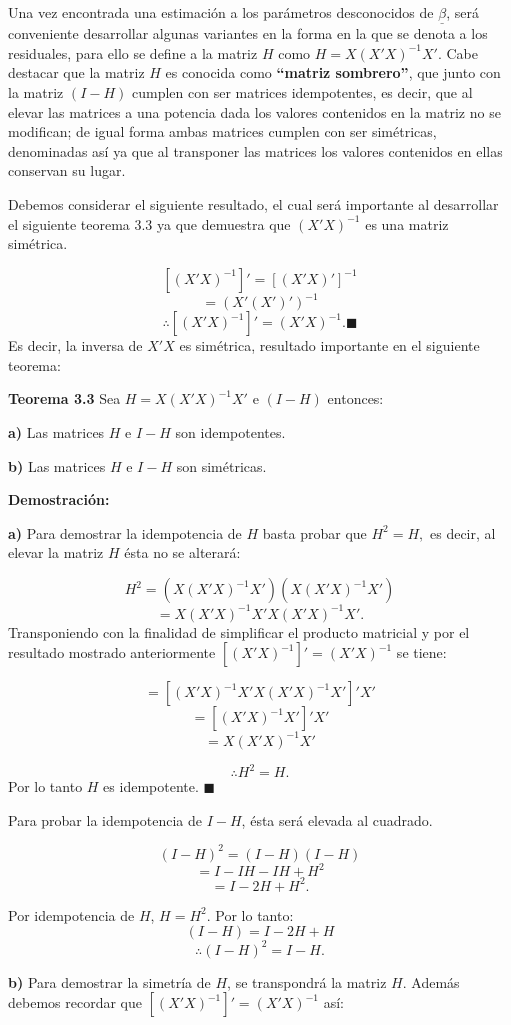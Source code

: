 \documentclass[
  a4paper,
  oneside,
  openany]{book}
\begin{document}
Una vez encontrada una estimación a los parámetros desconocidos de \(\underline{\beta}\), será conveniente desarrollar algunas variantes en la forma en la que se denota a los residuales, para ello se define a la matriz \(H\) como \(H=X(X'X)^{-1}X'.\) Cabe destacar que la matriz \(H\) es conocida como \textbf{``matriz sombrero''}, que junto con la matriz \((I-H)\) cumplen con ser matrices idempotentes, es decir, que al elevar las matrices a una potencia dada los valores contenidos en la matriz no se modifican; de igual forma ambas matrices cumplen con ser simétricas, denominadas así ya que al transponer las matrices los valores contenidos en ellas conservan su lugar.

Debemos considerar el siguiente resultado, el cual será importante al desarrollar el siguiente teorema 3.3 ya que demuestra que \((X'X)^{-1}\) es una matriz simétrica.

\[[(X'X)^{-1}]'=[(X'X)']^{-1}\]
\[=(X'(X')')^{-1}\]
\[\therefore [(X'X)^{-1}]'= (X'X)^{-1}. \blacksquare\]
Es decir, la inversa de \(X'X\) es simétrica, resultado importante en el siguiente teorema:

\textbf{Teorema 3.3} Sea \(H=X(X'X)^{-1}X'\) e \((I-H)\) entonces:

\textbf{a)} Las matrices \(H\) e \(I-H\) son idempotentes.

\textbf{b)} Las matrices \(H\) e \(I-H\) son simétricas.

\textbf{Demostración:}

\textbf{a)} Para demostrar la idempotencia de \(H\) basta probar que \(H^2=H,\) es decir, al elevar la matriz \(H\) ésta no se alterará:

\[H^2=(X(X'X)^{-1}X')(X(X'X)^{-1}X')\]
\[=X(X'X)^{-1}X'X(X'X)^{-1}X'.\]
Transponiendo con la finalidad de simplificar el producto matricial y por el resultado mostrado anteriormente \([(X'X)^{-1}]'=(X'X)^{-1}\) se tiene:

\[=[(X'X)^{-1}X'X(X'X)^{-1}X']'X'\]
\[=[(X'X)^{-1}X']'X'\]
\[=X(X'X)^{-1}X'\]

\[\therefore H^2=H.\]
Por lo tanto \(H\) es idempotente. \(\blacksquare\)

Para probar la idempotencia de \(I-H\), ésta será elevada al cuadrado.

\[(I-H)^2=(I-H)(I-H)\]
\[=I-IH-IH+H^2\]
\[=I-2H+H^2.\]

Por idempotencia de \(H\), \(H=H^2\). Por lo tanto:
\[(I-H)=I-2H+H\]
\[\therefore (I-H)^2=I-H.\]

\textbf{b)} Para demostrar la simetría de \(H\), se transpondrá la matriz \(H\). Además debemos recordar que \([(X'X)^{-1}]'=(X'X)^{-1}\) así:
\end{document}
